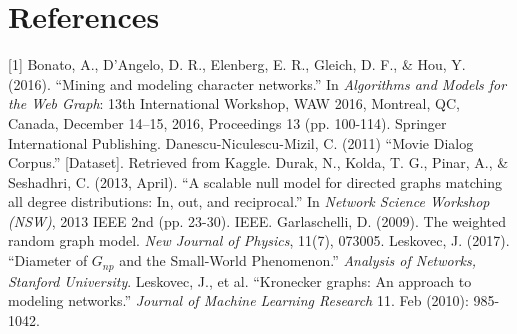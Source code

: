 \documentclass{article}
\begin{document}
\section{References}
[1] Bonato, A., D’Angelo, D. R., Elenberg, E. R., Gleich, D. F., \& Hou, Y. (2016). ``Mining and modeling character networks.'' In \textit{Algorithms and Models for the Web Graph}: 13th International Workshop, WAW 2016, Montreal, QC, Canada, December 14–15, 2016, Proceedings 13 (pp. 100-114). Springer International Publishing.
\newline\newline
[2] Danescu-Niculescu-Mizil, C. (2011) ``Movie Dialog Corpus.'' [Dataset]. Retrieved from Kaggle.
\newline\newline
[3] Durak, N., Kolda, T. G., Pinar, A., \& Seshadhri, C. (2013, April). ``A scalable null model for directed graphs matching all degree distributions: In, out, and reciprocal.'' In \textit{Network Science Workshop (NSW)}, 2013 IEEE 2nd (pp. 23-30). IEEE.
\newline\newline
[4] Garlaschelli, D. (2009). The weighted random graph model. \textit{New Journal of Physics}, 11(7), 073005.
\newline\newline
[5] Leskovec, J. (2017). ``Diameter of $G_{np}$ and the Small-World Phenomenon.'' \textit{Analysis of Networks, Stanford University}.
\newline\newline
[6] Leskovec, J., et al. ``Kronecker graphs: An approach to modeling networks.'' \textit{Journal of Machine Learning Research} 11. Feb (2010): 985-1042.
\end{document}
